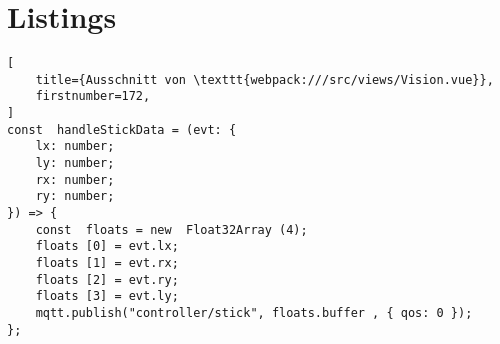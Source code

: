 \appendices
\clearpage
\section{Listings}

\lstset{
    numbers=left,
    xleftmargin=\dimexpr2.5em-1pt,
    framexleftmargin=2em,
    captionpos=tl,
}












\begin{lstlisting}[
    title={Ausschnitt von \texttt{webpack:///src/views/Vision.vue}},
    firstnumber=172,
]
const  handleStickData = (evt: {
    lx: number;
    ly: number;
    rx: number;
    ry: number;
}) => {
    const  floats = new  Float32Array (4);
    floats [0] = evt.lx;
    floats [1] = evt.rx;
    floats [2] = evt.ry;
    floats [3] = evt.ly;
    mqtt.publish("controller/stick", floats.buffer , { qos: 0 });
};
\end{lstlisting}